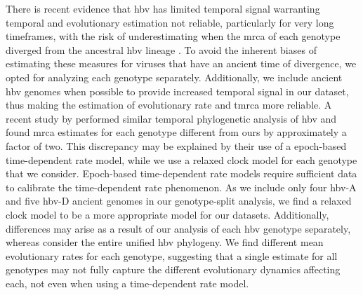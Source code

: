 There is recent evidence that \gls{hbv} has limited temporal signal warranting temporal and evolutionary estimation not reliable, particularly for very long timeframes, with the risk of underestimating when the \gls{mrca} of each genotype diverged from the ancestral \gls{hbv} lineage \citep{ross2018paradox}.
To avoid the inherent biases of estimating these measures for viruses that have an ancient time of divergence, we opted for analyzing each genotype separately.
Additionally, we include ancient \gls{hbv} genomes when possible to provide increased temporal signal in our dataset, thus making the estimation of evolutionary rate and \gls{tmrca} more reliable.
A recent study by \citet{kocher2021ten} performed similar temporal phylogenetic analysis of \gls{hbv} and found \gls{mrca} estimates for each genotype different from ours by approximately a factor of two.
This discrepancy may be explained by their use of a epoch-based time-dependent rate model, while we use a relaxed clock model for each genotype that we consider.
Epoch-based time-dependent rate models require sufficient data to calibrate the time-dependent rate phenomenon.
As we include only four \gls{hbv}-A and five \gls{hbv}-D ancient genomes in our genotype-split analysis, we find a relaxed clock model to be a more appropriate model for our datasets.
Additionally, differences may arise as a result of our analysis of each \gls{hbv} genotype separately, whereas \citet{kocher2021ten} consider the entire unified \gls{hbv} phylogeny.
We find different mean evolutionary rates for each genotype, suggesting that a single estimate for all genotypes may not fully capture the different evolutionary dynamics affecting each, not even when using a time-dependent rate model.

